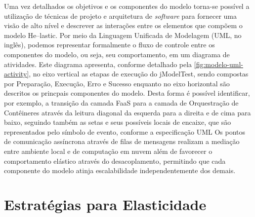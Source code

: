 \documentclass[english,brazilian]{UNISINOSmonografia} %
\begin{document}
Uma vez detalhados os objetivos e os componentes do modelo torna-se possível a utilização de técnicas de projeto e arquitetura de \textit{software} para fornecer uma visão de alto nível e descrever as interações entre os elementos que compõem o modelo \textsf{He}--lastic.
Por meio da Linguagem Unificada de Modelagem (UML, no inglês), podemos representar formalmente o fluxo de controle entre os componentes do modelo, ou seja, seu comportamento, em um diagrama de atividades.
%
Este diagrama apresenta, conforme detalhado pela \autoref{fig:modelo-uml-activity}, no eixo vertical as etapas de execução do jModelTest, sendo compostas por { Preparação,  Execução, Erro e Sucesso} enquanto no eixo horizontal são descritos os princpais componentes do modelo.
%
Desta forma é possível identificar, por exemplo, a transição da camada FaaS para a camada de Orquestração de Contêineres através da leitura diagonal da esquerda para a direita e de cima para baixo, seguindo também as setas e seus possíveis locais de encaixe, que são representados pelo símbolo de evento, conforme a especificação UML
%
Os pontos de comunicação assíncrona através de filas de mensagens realizam a mediação entre ambiente local e de computação em nuvem além de favorecer o comportamento elástico através do desacoplamento, permitindo que cada componente do modelo atinja escalabilidade independentemente dos demais.





\section{Estratégias para Elasticidade}
\label{sec:estrategias-elasticidade}
\end{document}

